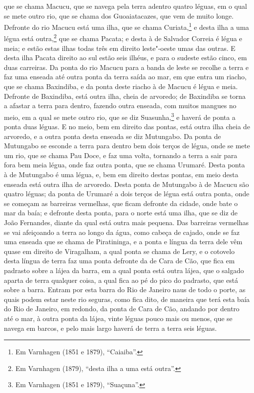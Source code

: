 que se chama Macucu, que se navega pela terra adentro quatro léguas, em o qual se mete
outro rio, que se chama dos Guoaiatacazes, que vem de muito longe. Defronte do rio Macucu
está uma ilha, que se chama Curiata,\footnote{ Em Varnhagen (1851 e 1879), ``Caiaiba''.} e
desta ilha a uma légua está outra,\footnote{ Em Varnhagen (1879), ``desta ilha a uma está
outra''.} que se chama Pacata; e desta à de Salvador Correia é légua e meia; e estão estas
ilhas todas três em direito leste"-oeste umas das outras. E desta ilha Pacata direito ao
sul estão seis ilhéus, e para o sudeste estão cinco, em duas carreiras. Da ponta do rio
Macucu para a banda de leste se recolhe a terra e faz uma enseada até outra ponta da terra
saída ao mar, em que entra um riacho, que se chama Baxindiba, e da ponta deste riacho à de
Macucu é légua e meia. Defronte de Baxindiba, está outra ilha, cheia de arvoredo; de
Baxindiba se torna a afastar a terra para dentro, fazendo outra enseada, com muitos
mangues no meio, em a qual se mete outro rio, que se diz Suasunha,\footnote{ Em Varnhagen
(1851 e 1879), ``Suaçuna''.} e haverá de ponta a ponta duas léguas. E no meio, bem em
direito das pontas, está outra ilha cheia de arvoredo, e a outra ponta desta enseada se
diz Mutungabo. Da ponta de Mutungabo se esconde a terra para dentro bem dois terços de
légua, onde se mete um rio, que se chama Pau Doce, e faz uma volta, tornando a terra a
sair para fora bem meia légua, onde faz outra ponta, que se chama Urumaré. Desta ponta à
de Mutungabo é uma légua, e, bem em direito destas pontas, em meio desta enseada está
outra ilha de arvoredo. Desta ponta de Mutungabo à de Macucu são quatro léguas; da ponta
de Urumaré a dois terços de légua está outra ponta, onde se começam as barreiras
vermelhas, que ficam defronte da cidade, onde bate o mar da baía; e defronte desta ponta,
para o norte está uma ilha, que se diz de João Fernandes, diante da qual está outra mais
pequena. Das barreiras vermelhas se vai afeiçoando a terra ao longo da água, como cabeça
de cajado, onde se faz uma enseada que se chama de Piratininga, e a ponta e língua da
terra dele vêm quase em direito de Viragalham, a qual ponta se chama de Lery, e o cotovelo
desta língua de terra faz uma ponta defronte da de Cara de Cão, que fica em padrasto sobre
a lájea da barra, em a qual ponta está outra lájea, que o salgado aparta de terra qualquer
coisa, a qual fica ao pé do pico do padrasto, que está sobre a barra. Entram por esta
barra do Rio de Janeiro naus de todo o porte, as quais podem estar neste rio seguras, como
fica dito, de maneira que terá esta baía do Rio de Janeiro, em redondo, da ponta de Cara
de Cão, andando por dentro até o mar, à outra ponta da lájea, vinte léguas pouco mais ou
menos, que se navega em barcos, e pelo mais largo haverá de terra a terra seis léguas.

